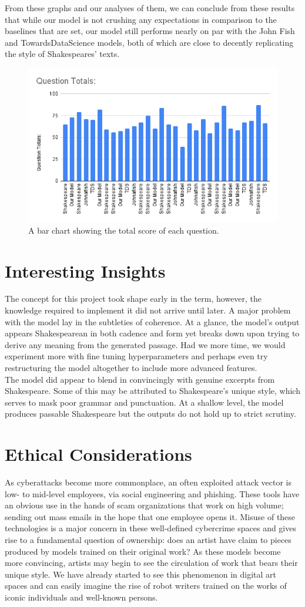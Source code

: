 \documentclass[11pt,a4paper]{article}
\begin{document}
From these graphs and our analyses of them, we can conclude from these results that while our model is not crushing any expectations in comparison to the baselines that are set, our model still performs nearly on par with the John Fish and TowardsDataScience models, both of which are close to decently replicating the style of Shakespeares’ texts.\\ 
\begin{figure}
\centering
\includegraphics[width=.45\textwidth]{report/qTotals.png}
\caption{\label{fig:QuestionTotals}A bar chart showing the total score of each question.}
\end{figure}

\section{Interesting Insights}
\label{sec:insight}
The concept for this project took shape early in the term, however, the knowledge required to implement it did not arrive until later. A major problem with the model lay in the subtleties of coherence. At a glance, the model’s output appears Shakespearean in both cadence and form yet breaks down upon trying to derive any meaning from the generated passage. Had we more time, we would experiment more with fine tuning hyperparameters and perhaps even try restructuring the model altogether to include more advanced features.\\
The model did appear to blend in convincingly with genuine excerpts from Shakespeare. Some of this may be attributed to Shakespeare’s unique style, which serves to mask poor grammar and punctuation. At a shallow level, the model produces passable Shakespeare but the outputs do not hold up to strict scrutiny. 

\section{Ethical Considerations}
\label{ssec:ethics}
As cyberattacks become more commonplace, an often exploited attack vector is low- to mid-level employees, via social engineering and phishing. These tools have an obvious use in the hands of scam organizations that work on high volume; sending out mass emails in the hope that one employee opens it. Misuse of these technologies is a major concern in these well-defined cybercrime spaces and gives rise to a fundamental question of ownership: does an artist have claim to pieces produced by models trained on their original work? As these models become more convincing, artists may begin to see the circulation of work that bears their unique style. We have already started to see this phenomenon in digital art spaces and can easily imagine the rise of robot writers trained on the works of iconic individuals and well-known persons.\\
\end{document}

